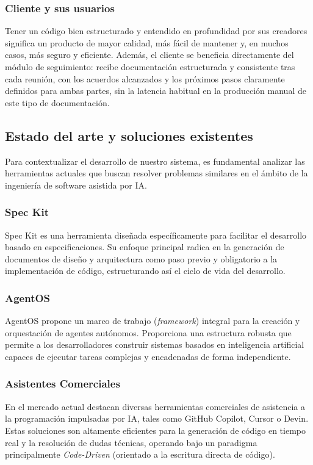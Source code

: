 \documentclass[11pt, letterpaper]{article}
\begin{document}
\subsubsection{Cliente y sus usuarios}
\label{sec:cliente_usuarios}

Tener un código bien estructurado y entendido en profundidad por sus creadores significa un producto de mayor calidad, más fácil de mantener y, en muchos casos, más seguro y eficiente. Además, el cliente se beneficia directamente del módulo de seguimiento: recibe documentación estructurada y consistente tras cada reunión, con los acuerdos alcanzados y los próximos pasos claramente definidos para ambas partes, sin la latencia habitual en la producción manual de este tipo de documentación.


\subsection{Estado del arte y soluciones existentes}
\label{sec:estado_arte}
Para contextualizar el desarrollo de nuestro sistema, es fundamental analizar las herramientas actuales que buscan resolver problemas similares en el ámbito de la ingeniería de software asistida por IA.

\subsubsection{Spec Kit}
\label{sec:spec_kit}
Spec Kit es una herramienta diseñada específicamente para facilitar el desarrollo basado en especificaciones. Su enfoque principal radica en la generación de documentos de diseño y arquitectura como paso previo y obligatorio a la implementación de código, estructurando así el ciclo de vida del desarrollo. \cite{github_spec_kit}

\subsubsection{AgentOS}
\label{sec:agentos}
AgentOS propone un marco de trabajo (\textit{framework}) integral para la creación y orquestación de agentes autónomos. Proporciona una estructura robusta que permite a los desarrolladores construir sistemas basados en inteligencia artificial capaces de ejecutar tareas complejas y encadenadas de forma independiente. \cite{buildermethods_agent_os} \cite{yao_react_2023}

\subsubsection{Asistentes Comerciales}
\label{sec:asistentes_comerciales}
En el mercado actual destacan diversas herramientas comerciales de asistencia a la programación impulsadas por IA, tales como GitHub Copilot, Cursor o Devin. Estas soluciones son altamente eficientes para la generación de código en tiempo real y la resolución de dudas técnicas, operando bajo un paradigma principalmente \textit{Code-Driven} (orientado a la escritura directa de código). \cite{github_copilot_docs} \cite{cursor_ai} \cite{chen_codex_2021} \cite{peng_copilot_2023}
\end{document}
